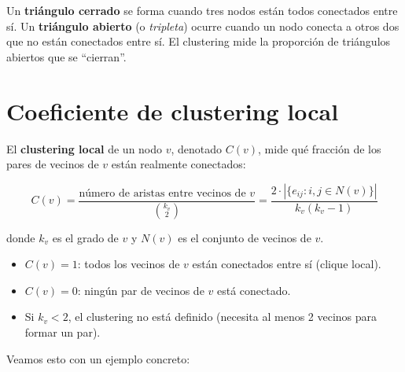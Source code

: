\documentclass[
  letterpaper,
  DIV=11,
  numbers=noendperiod]{scrreprt}
\providecommand{\tightlist}{%
  \setlength{\itemsep}{0pt}\setlength{\parskip}{0pt}}
\begin{document}
\begin{tcolorbox}[enhanced jigsaw, toprule=.15mm, colframe=quarto-callout-tip-color-frame, coltitle=black, titlerule=0mm, colback=white, breakable, leftrule=.75mm, arc=.35mm, bottomtitle=1mm, toptitle=1mm, rightrule=.15mm, bottomrule=.15mm, left=2mm, title=\textcolor{quarto-callout-tip-color}{\faLightbulb}\hspace{0.5em}{💡 Concepto clave}, colbacktitle=quarto-callout-tip-color!10!white, opacityback=0, opacitybacktitle=0.6]

Un \textbf{triángulo cerrado} se forma cuando tres nodos están todos
conectados entre sí. Un \textbf{triángulo abierto} (o \emph{tripleta})
ocurre cuando un nodo conecta a otros dos que no están conectados entre
sí. El clustering mide la proporción de triángulos abiertos que se
``cierran''.

\end{tcolorbox}

\section{Coeficiente de clustering
local}\label{coeficiente-de-clustering-local}

El \textbf{clustering local} de un nodo \(v\), denotado \(C(v)\), mide
qué fracción de los pares de vecinos de \(v\) están realmente
conectados:

\[
C(v) = \frac{\text{número de aristas entre vecinos de } v}{\binom{k_v}{2}} = \frac{2 \cdot |\{e_{ij} : i,j \in N(v)\}|}{k_v(k_v - 1)}
\]

donde \(k_v\) es el grado de \(v\) y \(N(v)\) es el conjunto de vecinos
de \(v\).

\begin{itemize}
\tightlist
\item
  \(C(v) = 1\): todos los vecinos de \(v\) están conectados entre sí
  (clique local).
\item
  \(C(v) = 0\): ningún par de vecinos de \(v\) está conectado.
\item
  Si \(k_v < 2\), el clustering no está definido (necesita al menos 2
  vecinos para formar un par).
\end{itemize}

Veamos esto con un ejemplo concreto:
\end{document}
